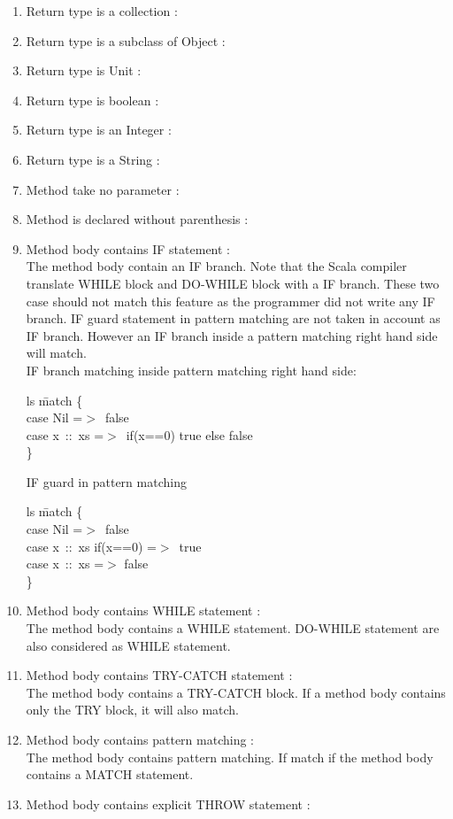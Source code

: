 \documentclass[12pt]{article}
\newcommand{\code}[1]{{\fontfamily{phv}\selectfont \begin{tabbing} #1 \end{tabbing}}}
\begin{document}
\begin{enumerate}
\item Return type is a collection :
\item Return type is a subclass of Object : 
\item Return type is Unit :
\item Return type is boolean : 
\item Return type is an Integer :
\item Return type is a String : 
\item Method take no parameter :
\item Method is declared without parenthesis :
\item Method body contains IF statement :\\
	The method body contain an IF branch. Note that the Scala compiler translate WHILE block and DO-WHILE block with a IF branch. These two case should not match this feature as the programmer did not write any IF branch. IF guard statement in pattern matching are not taken in account as IF branch. However an IF branch inside a pattern matching right hand side will match.\\
IF branch matching inside pattern matching right hand side:
\code{
ls \=match \{\\
\>case Nil =$>$\ false\\
\>case x\ ::\ xs =$>$\ if(x==0) true else false\\
\}
}
IF guard in pattern matching
\code{
ls \=match \{\\
\>case Nil =$>$\ false\\
\>case x\ ::\ xs if(x==0) =$>$\ true\\
\>case x\ ::\ xs =$>$ false\\
\}
}
\item Method body contains WHILE statement :\\
	The method body contains a WHILE statement. DO-WHILE statement are also considered as WHILE statement.
\item Method body contains TRY-CATCH statement :\\
	The method body contains a TRY-CATCH block. If a method body contains only the TRY block, it will also match.
\item Method body contains pattern matching : \\
	The method body contains pattern matching. If match if the method body contains a MATCH statement.
\item Method body contains explicit THROW statement :\\

\end{enumerate}
\end{document}
